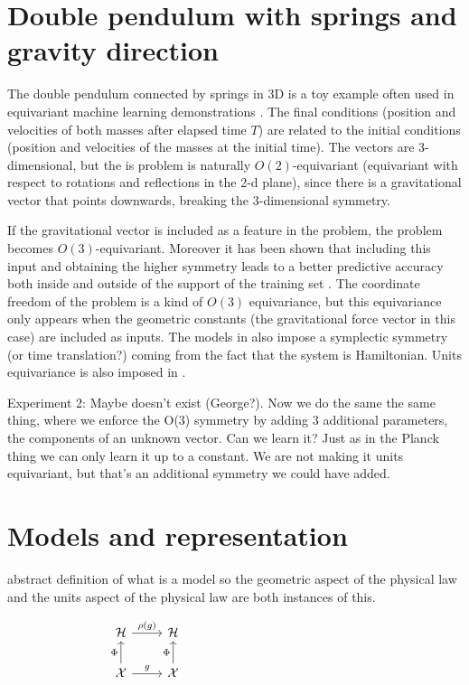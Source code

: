 \documentclass{article}
\begin{document}
\section{Double pendulum with springs and gravity direction}

The double pendulum connected by springs in 3D is a toy example often used in equivariant machine learning demonstrations \cite{finzi2021practical}. 
The final conditions (position and velocities of both masses after elapsed time $T$) are related to the initial conditions (position and velocities of the masses at the initial time).
The vectors are 3-dimensional, but the is problem is naturally $O(2)$-equivariant (equivariant with respect to rotations and reflections in the 2-d plane), since there is a gravitational vector that points downwards, breaking the 3-dimensional symmetry.

If the gravitational vector is included as a feature in the problem, the problem becomes $O(3)$-equivariant. Moreover it has been shown that including this input and obtaining the higher symmetry leads to a better predictive accuracy both inside and outside of the support of the training set \cite{yao2021simple}. The coordinate freedom of the problem is a kind of $O(3)$ equivariance, but this equivariance only appears when the geometric constants (the gravitational force vector in this case) are included as inputs. The models in \cite{finzi2021practical,yao2021simple, villar2022dimensionless} also impose a symplectic symmetry (or time translation?) coming from the fact that the system is Hamiltonian. Units equivariance is also imposed in \cite{villar2022dimensionless}.


Experiment 2: Maybe doesn't exist (George?). Now we do the same the same thing, where we enforce the O(3) symmetry by adding 3 additional parameters, the components of an unknown vector. Can we learn it? Just as in the Planck thing we can only learn it up to a constant. We are not making it units equivariant, but that's an additional symmetry we could have added. 




\section{Models and representation}
abstract definition of what is a model so the geometric aspect of the physical law and the units aspect of the physical law are both instances of this. 



$$
\begin{tikzcd}[]%
  {\cal H}\arrow[r,"\rho(g)"] & {\cal H}\\
{\cal X} \arrow[u,"\Phi"] \arrow[r,"g"] & {\cal X} \arrow[u,"\Phi"]
\end{tikzcd}
~~~~~~~~~~~~~~~~~~~~~~~~~~~~~~~~~~~~~~~~~~
$$
\end{document}
